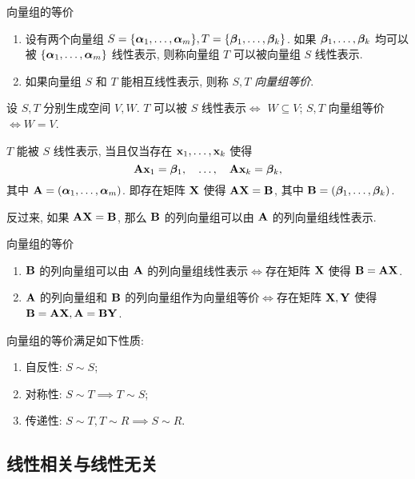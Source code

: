 \begin{frame}{向量组的等价}
	\onslide<+->
	\begin{definition}
		\begin{enumerate}
			\item 设有两个向量组 $S=\{{\boldsymbol{\alpha}}_1,\dots,{\boldsymbol{\alpha}}_m\}, T=\{{\boldsymbol{\beta}}_1,\dots,{\boldsymbol{\beta}}_k\}$.
			如果 ${\boldsymbol{\beta}}_1,\dots,{\boldsymbol{\beta}}_k$ 均可以被 $\{{\boldsymbol{\alpha}}_1,\dots,{\boldsymbol{\alpha}}_m\}$ 线性表示, 则称向量组 $T$ 可以被向量组 $S$ 线性表示.
			\item 如果向量组 $S$ 和 $T$ 能相互线性表示, 则称 $S,T$ \emph{向量组等价}.
		\end{enumerate}
	\end{definition}
	\onslide<+->
	设 $S,T$ 分别生成空间 $V,W$.
	\onslide<+->
	$T$ 可以被 $S$ 线性表示$\iff$ $W\subseteq V$;  $S,T$ 向量组等价$\iff W=V$.

	\onslide<+->
	$T$ 能被 $S$ 线性表示, 当且仅当存在 ${\mathbf{x}}_1,\dots,{\mathbf{x}}_k$ 使得
	\[{\mathbf{A}}{\mathbf{x}}_1={\boldsymbol{\beta}}_1,\quad\dots,\quad{\mathbf{A}}{\mathbf{x}}_k={\boldsymbol{\beta}}_k,\]
	其中 ${\mathbf{A}}=({\boldsymbol{\alpha}}_1,\dots,{\boldsymbol{\alpha}}_m)$.
	\onslide<+->
	即存在矩阵 ${\mathbf{X}}$ 使得 ${\mathbf{A}}{\mathbf{X}}={\mathbf{B}}$, 其中 ${\mathbf{B}}=({\boldsymbol{\beta}}_1,\dots,{\boldsymbol{\beta}}_k)$.

	\onslide<+->
	反过来, 如果 ${\mathbf{A}}{\mathbf{X}}={\mathbf{B}}$, 那么 ${\mathbf{B}}$ 的列向量组可以由 ${\mathbf{A}}$ 的列向量组线性表示.
\end{frame}


\begin{frame}{向量组的等价}
	\onslide<+->
	\begin{theorem}
		\begin{enumerate}
			\item ${\mathbf{B}}$ 的列向量组可以由 ${\mathbf{A}}$ 的列向量组线性表示$\iff$存在矩阵 ${\mathbf{X}}$ 使得 ${\mathbf{B}}={\mathbf{A}}{\mathbf{X}}$.
			\item ${\mathbf{A}}$ 的列向量组和 ${\mathbf{B}}$ 的列向量组作为向量组等价$\iff$存在矩阵 ${\mathbf{X}},{\mathbf{Y}}$ 使得 ${\mathbf{B}}={\mathbf{A}}{\mathbf{X}},{\mathbf{A}}={\mathbf{B}}{\mathbf{Y}}$.
		\end{enumerate}
	\end{theorem}
	\onslide<+->
	\begin{proposition}
		向量组的等价满足如下性质:
		\begin{enumerate}
			\item 自反性: $S\sim S$;
			\item 对称性: $S\sim T\implies T\sim S$;
			\item 传递性: $S\sim T,T\sim R\implies S\sim R$.
		\end{enumerate}
	\end{proposition}
\end{frame}


\subsection{线性相关与线性无关}

